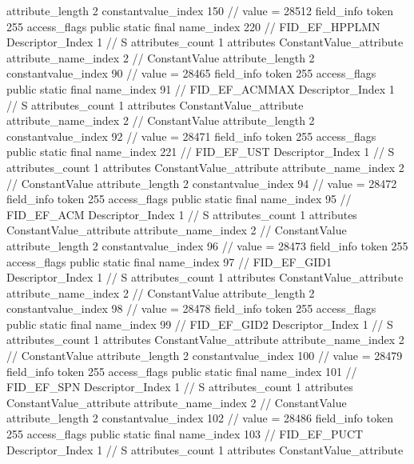 {{{{{{{					attribute_length	2
					constantvalue_index	150		// value = 28512
				}
				}
			}
			field_info {
				token	255
				access_flags	public static final
				name_index	220		// FID_EF_HPPLMN
				Descriptor_Index	1		// S
				attributes_count	1
				attributes {
				ConstantValue_attribute {
					attribute_name_index	2		// ConstantValue
					attribute_length	2
					constantvalue_index	90		// value = 28465
				}
				}
			}
			field_info {
				token	255
				access_flags	public static final
				name_index	91		// FID_EF_ACMMAX
				Descriptor_Index	1		// S
				attributes_count	1
				attributes {
				ConstantValue_attribute {
					attribute_name_index	2		// ConstantValue
					attribute_length	2
					constantvalue_index	92		// value = 28471
				}
				}
			}
			field_info {
				token	255
				access_flags	public static final
				name_index	221		// FID_EF_UST
				Descriptor_Index	1		// S
				attributes_count	1
				attributes {
				ConstantValue_attribute {
					attribute_name_index	2		// ConstantValue
					attribute_length	2
					constantvalue_index	94		// value = 28472
				}
				}
			}
			field_info {
				token	255
				access_flags	public static final
				name_index	95		// FID_EF_ACM
				Descriptor_Index	1		// S
				attributes_count	1
				attributes {
				ConstantValue_attribute {
					attribute_name_index	2		// ConstantValue
					attribute_length	2
					constantvalue_index	96		// value = 28473
				}
				}
			}
			field_info {
				token	255
				access_flags	public static final
				name_index	97		// FID_EF_GID1
				Descriptor_Index	1		// S
				attributes_count	1
				attributes {
				ConstantValue_attribute {
					attribute_name_index	2		// ConstantValue
					attribute_length	2
					constantvalue_index	98		// value = 28478
				}
				}
			}
			field_info {
				token	255
				access_flags	public static final
				name_index	99		// FID_EF_GID2
				Descriptor_Index	1		// S
				attributes_count	1
				attributes {
				ConstantValue_attribute {
					attribute_name_index	2		// ConstantValue
					attribute_length	2
					constantvalue_index	100		// value = 28479
				}
				}
			}
			field_info {
				token	255
				access_flags	public static final
				name_index	101		// FID_EF_SPN
				Descriptor_Index	1		// S
				attributes_count	1
				attributes {
				ConstantValue_attribute {
					attribute_name_index	2		// ConstantValue
					attribute_length	2
					constantvalue_index	102		// value = 28486
				}
				}
			}
			field_info {
				token	255
				access_flags	public static final
				name_index	103		// FID_EF_PUCT
				Descriptor_Index	1		// S
				attributes_count	1
				attributes {
				ConstantValue_attribute {
}}}}}}}
